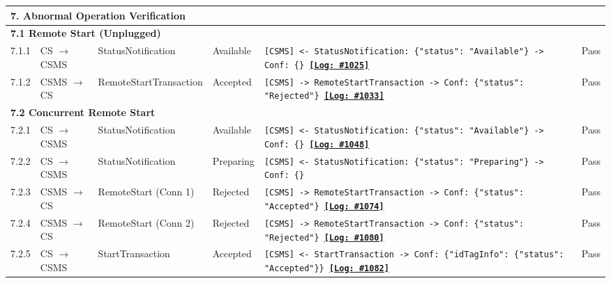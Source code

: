 \documentclass[10pt, a4paper, landscape]{article}
\begin{document}
\begin{longtable}{|p{1.0cm}|p{2.5cm}|p{4.0cm}|p{5.0cm}|p{10.0cm}|c|}
\multicolumn{6}{|l|}{\cellcolor{blue!10}\textbf{7. Abnormal Operation Verification}} \\
\hline
\multicolumn{6}{|l|}{\textbf{7.1 Remote Start (Unplugged)}} \\
\hline
7.1.1 & CS $\to$ CSMS & StatusNotification & Available & \footnotesize\texttt{[CSMS] <- StatusNotification: \{"status": "Available"\} \newline [CSMS] -> Conf: \{\} \newline \hyperref[log:7.1.1]{\textbf{[Log: \#1025]}}} & Pass \\
\hline
7.1.2 & CSMS $\to$ CS & RemoteStartTransaction & Accepted & \footnotesize\texttt{[CSMS] -> RemoteStartTransaction \newline [CS] -> Conf: \{"status": "Rejected"\} \newline \hyperref[log:7.1.2]{\textbf{[Log: \#1033]}}} & Pass \\
\hline
\multicolumn{6}{|l|}{\textbf{7.2 Concurrent Remote Start}} \\
\hline
7.2.1 & CS $\to$ CSMS & StatusNotification & Available & \footnotesize\texttt{[CSMS] <- StatusNotification: \{"status": "Available"\} \newline [CSMS] -> Conf: \{\} \newline \hyperref[log:7.2.1]{\textbf{[Log: \#1048]}}} & Pass \\
\hline
7.2.2 & CS $\to$ CSMS & StatusNotification & Preparing & \footnotesize\texttt{[CSMS] <- StatusNotification: \{"status": "Preparing"\} \newline [CSMS] -> Conf: \{\}} & Pass \\
\hline
7.2.3 & CSMS $\to$ CS & RemoteStart (Conn 1) & Rejected & \footnotesize\texttt{[CSMS] -> RemoteStartTransaction \newline [CS] -> Conf: \{"status": "Accepted"\} \newline \hyperref[log:7.2.3]{\textbf{[Log: \#1074]}}} & Pass \\
\hline
7.2.4 & CSMS $\to$ CS & RemoteStart (Conn 2) & Rejected & \footnotesize\texttt{[CSMS] -> RemoteStartTransaction \newline [CS] -> Conf: \{"status": "Rejected"\} \newline \hyperref[log:7.2.4]{\textbf{[Log: \#1080]}}} & Pass \\
\hline
7.2.5 & CS $\to$ CSMS & StartTransaction & Accepted & \footnotesize\texttt{[CSMS] <- StartTransaction \newline [CSMS] -> Conf: \{"idTagInfo": \{"status": "Accepted"\}\} \newline \hyperref[log:7.2.5]{\textbf{[Log: \#1082]}}} & Pass \\

\end{longtable}
\end{document}
